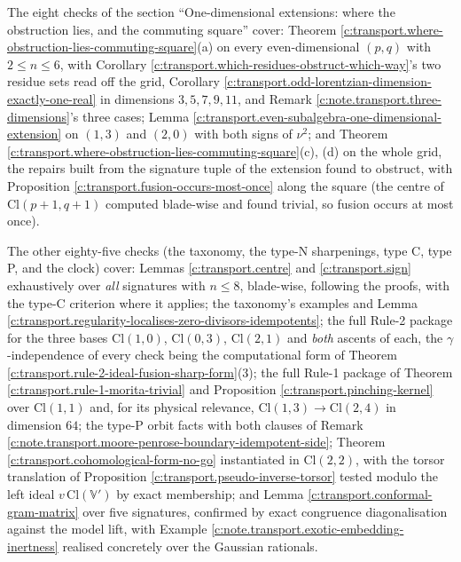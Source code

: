 \documentclass[11pt]{article}
\theoremstyle{definition}
\theoremstyle{plain}
\providecommand{\Cl}{}\renewcommand{\Cl}{\mathrm{Cl}}
\begin{document}
The eight checks of the section ``One-dimensional extensions: where the obstruction lies, and the commuting square'' cover: Theorem \ref{c:transport.where-obstruction-lies-commuting-square}(a) on every even-dimensional $(p,q)$ with $2 \leq n \leq 6$, with Corollary \ref{c:transport.which-residues-obstruct-which-way}'s two residue sets read off the grid, Corollary \ref{c:transport.odd-lorentzian-dimension-exactly-one-real} in dimensions $3, 5, 7, 9, 11$, and Remark \ref{c:note.transport.three-dimensions}'s three cases; Lemma \ref{c:transport.even-subalgebra-one-dimensional-extension} on $(1,3)$ and $(2,0)$ with both signs of $\nu^2$; and Theorem \ref{c:transport.where-obstruction-lies-commuting-square}(c), (d) on the whole grid, the repairs built from the signature tuple of the extension found to obstruct, with Proposition \ref{c:transport.fusion-occurs-most-once} along the square (the centre of $\Cl(p{+}1,q{+}1)$ computed blade-wise and found trivial, so fusion occurs at most once).

The other eighty-five checks (the taxonomy, the type-N sharpenings, type C, type P, and the clock) cover: Lemmas \ref{c:transport.centre} and \ref{c:transport.sign} exhaustively over \emph{all} signatures with $n \leq 8$, blade-wise, following the proofs, with the type-C criterion where it applies; the taxonomy's examples and Lemma \ref{c:transport.regularity-localises-zero-divisors-idempotents}; the full Rule-2 package for the three bases $\Cl(1,0)$, $\Cl(0,3)$, $\Cl(2,1)$ and \emph{both} ascents of each, the $\gamma$-independence of every check being the computational form of Theorem \ref{c:transport.rule-2-ideal-fusion-sharp-form}(3); the full Rule-1 package of Theorem \ref{c:transport.rule-1-morita-trivial} and Proposition \ref{c:transport.pinching-kernel} over $\Cl(1,1)$ and, for its physical relevance, $\Cl(1,3) \to \Cl(2,4)$ in dimension $64$; the type-P orbit facts with both clauses of Remark \ref{c:note.transport.moore-penrose-boundary-idempotent-side}; Theorem \ref{c:transport.cohomological-form-no-go} instantiated in $\Cl(2,2)$, with the torsor translation of Proposition \ref{c:transport.pseudo-inverse-torsor} tested modulo the left ideal $v\,\Cl(\mathbb{V}')$ by exact membership; and Lemma \ref{c:transport.conformal-gram-matrix} over five signatures, confirmed by exact congruence diagonalisation against the model lift, with Example \ref{c:note.transport.exotic-embedding-inertness} realised concretely over the Gaussian rationals.
\end{document}
